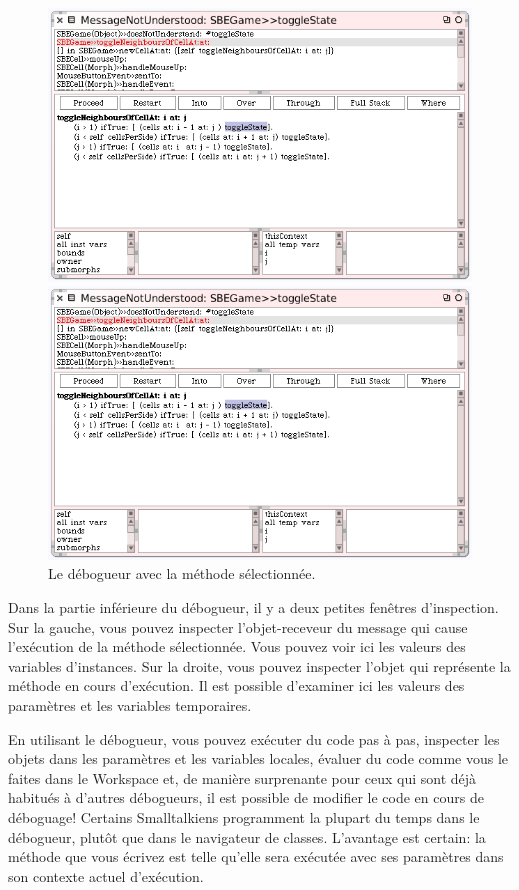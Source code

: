 \documentclass[a4paper,10pt,twoside]{book}
\begin{document}
\begin{figure}[ht]
\ifluluelse
	{\centerline {\includegraphics[width=\textwidth]{Debugger}}}
	{\centerline {\includegraphics[scale=0.7]{Debugger}}}
\caption{Le débogueur avec la méthode  sélectionnée.
\label{fig:debugToggle}}
\end{figure}

Dans la partie inf\'erieure du débogueur, il y a deux petites fenêtres
d'inspection. Sur la gauche, vous pouvez inspecter l'objet-receveur du message qui cause l'exécution de la méthode sélectionnée. Vous pouvez voir ici les valeurs des variables d'instances.
Sur la droite, vous pouvez inspecter l'objet qui représente la méthode en cours d'exécution. Il est possible d'examiner ici les valeurs des paramètres et les variables temporaires.

En utilisant le débogueur, vous pouvez exécuter du code pas à pas,
inspecter les objets dans les paramètres et les variables locales,
évaluer du code comme vous le faites dans le Workspace et, de manière
surprenante pour ceux qui sont déjà habitués à d'autres débogueurs, il
est possible de modifier le code en cours de déboguage! 
Certains Smalltalkiens programment la plupart du temps dans le
débogueur, plutôt que dans le navigateur de classes.
L'avantage est certain: la m\'ethode que vous \'ecrivez est telle
qu'elle sera ex\'ecut\'ee \ie avec ses param\`etres dans son contexte
actuel d'ex\'ecution.
\end{document}
